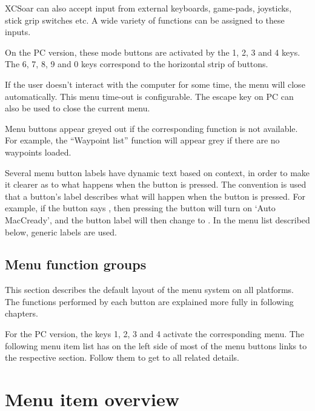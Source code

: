 XCSoar can also accept input from external keyboards, game-pads, joysticks,
stick grip switches etc. A wide variety of functions can be assigned to these
inputs.

On the PC version, these mode buttons are activated by the
1, 2, 3 and 4 keys.  The 6, 7, 8, 9 and 0 keys correspond to the horizontal
strip of buttons.

If the user doesn't interact with the computer for some time, the
menu will close automatically.  This menu time-out is configurable.
The escape key on PC can also be used to close the current menu.

Menu buttons appear greyed out if the corresponding function is not available. 
For example, the ``Waypoint list'' function will appear grey if there are no waypoints loaded.

Several menu button labels have dynamic text based on context, in
order to make it clearer as to what happens when the button is
pressed.  The convention is used that a button's label describes what
will happen when the button is pressed.  For example, if the button
says , then pressing the button will turn on `Auto
MacCready', and the button label will then change to . 
In the menu list described below, generic labels are used.

\subsection*{Menu function groups}
This section describes the default layout of the menu system on all
platforms.  The functions performed by each button are explained more
fully in following chapters.

For the PC version, the keys 1, 2, 3 and 4 activate the 
corresponding menu.  The following menu item list has on the left side of most 
of the menu buttons links to the respective section. Follow them to get to all 
related details.

\section{Menu item overview}

